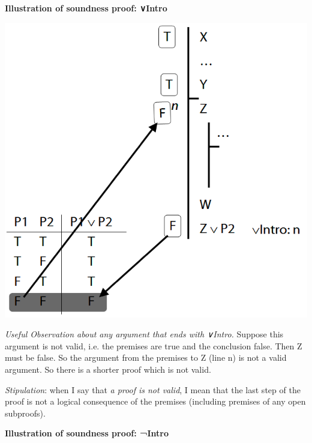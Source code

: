 \documentclass[12pt]{extarticle}
\begin{document}
\begin{multicols*}{3}
\begin{minipage}{\columnwidth}
\textbf{Illustration of soundness proof: ∨Intro}
 
\begin{center}
\includegraphics[scale=0.3]{img/soundness_or.png}
\end{center}
\end{minipage}
 
\emph{Useful Observation about any argument that ends with ∨Intro.} Suppose this argument is not valid, i.e. the premises are true and the conclusion false. Then Z must be false. So the argument from the premises to Z (line n) is not a valid argument. So there is a shorter proof which is not valid.
 
\emph{Stipulation}: when I say that \emph{a proof is not valid}, I mean that the last step of the proof is not a logical consequence of the premises (including premises of any open subproofs).
 
\begin{minipage}{\columnwidth}
 
\textbf{Illustration of soundness proof: ¬Intro}
 

\end{minipage}
\end{multicols*}
\end{document}

